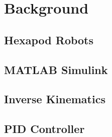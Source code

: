 \chapter{Background}
\label{ch:background}


\section{Hexapod Robots}

\section{MATLAB Simulink}

\section{Inverse Kinematics}

\section{PID Controller}